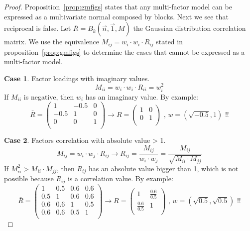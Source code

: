 \documentclass[11pt,fleqn]{book} %
\begin{document}
\begin{proof}
	Proposition~\ref{prop:gmfigs} states that any multi-factor model 
	can be expressed as a multivariate normal composed by blocks.
	Next we see that reciprocal is false. Let 
	$\bar{R} = B_k(\vec{n},\vec{1},M)$ the Gaussian distribution 
	correlation matrix. We use the equivalence 
	$M_{ij} = w_i \cdot w_i \cdot R_{ij}$ stated in 
	proposition~\ref{prop:gmfigs} to determine the cases that cannot be 
	expressed as a multi-factor model.

	\textbf{Case 1}. Factor loadings with imaginary values.
	\begin{displaymath}
		M_{ii} = w_i \cdot w_i \cdot R_{ii} = w_i^2
	\end{displaymath}
	If $M_{ii}$ is negative, then $w_i$ has an imaginary value.
	By example:
	\begin{displaymath}
		\bar{R} = \left(
		\begin{array}{cc|c}
			1    & -0.5 & 0 \\
			-0.5 & 1    & 0 \\
			\hline
			0    & 0    & 1 \\
		\end{array}
		\right) 
		\longrightarrow
		R = \left(
		\begin{array}{cc}
			1 & 0 \\
			0 & 1 \\
		\end{array}
		\right)
		\text{ , }
		w = (\sqrt{-0.5}, 1)
		\text{ !!}
	\end{displaymath}
	
	\textbf{Case 2}. Factors correlation with absolute value > 1.
	\begin{displaymath}
		M_{ij} = w_i \cdot w_j \cdot R_{ij} \longrightarrow 
		R_{ij} = \frac{M_{ij}}{w_i \cdot w_j} = 
		\frac{M_{ij}}{\sqrt{M_{ii} \cdot M_{jj}}}
	\end{displaymath}
	If $M_{ii}^2 > M_{ii} \cdot M_{jj}$, then $R_{ij}$ has an absolute value
	bigger than 1, which is not possible because $R_{ij}$ is a correlation
	value. By example:
	\begin{displaymath}
		\bar{R} = \left(
		\begin{array}{cc|cc}
			1   & 0.5 & 0.6 & 0.6 \\
			0.5 & 1   & 0.6 & 0.6 \\
			\hline
			0.6 & 0.6 & 1   & 0.5 \\
			0.6 & 0.6 & 0.5 & 1   \\
		\end{array}
		\right) 
		\longrightarrow
		R = \left(
		\begin{array}{cc}
			1               & \frac{0.6}{0.5} \\
			\frac{0.6}{0.5} & 1               \\
		\end{array}
		\right)
		\text{ , }
		w = (\sqrt{0.5}, \sqrt{0.5})
		\text{ !!}
	\end{displaymath}
\end{proof}
\end{document}

